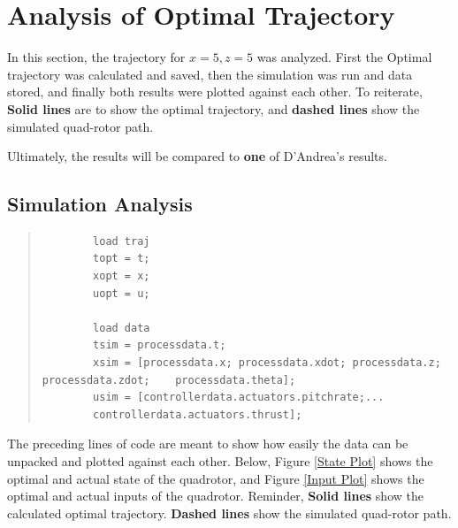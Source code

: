 \documentclass[12pt]{article}
\begin{document}
	\section{Analysis of Optimal Trajectory}
	
	In this section, the trajectory for $x=5,z=5$ was analyzed. First the Optimal trajectory was calculated and saved, then the simulation was run and data stored, and finally both results were plotted against each other. To reiterate, \textbf{Solid lines} are to show the optimal trajectory, and \textbf{dashed lines} show the simulated quad-rotor path.
	
	Ultimately, the results will be compared to \textbf{one} of D'Andrea's results\cite{D'Andrea}. 
	
	\subsection{Simulation Analysis}
	\begin{quote}
		\begin{lstlisting}
		load traj
		topt = t;
		xopt = x;
		uopt = u;
		
		load data
		tsim = processdata.t;
		xsim = [processdata.x; processdata.xdot; processdata.z; processdata.zdot;    processdata.theta];
		usim = [controllerdata.actuators.pitchrate;...
		controllerdata.actuators.thrust];
		\end{lstlisting}
	\end{quote}
	The preceding lines of code are meant to show how easily the data can be unpacked and plotted against each other. Below, Figure \ref{State Plot} shows the optimal and actual state of the quadrotor, and Figure \ref{Input Plot} shows the optimal and actual inputs of the quadrotor.
	\newline
	\newline
	Reminder, \textbf{Solid lines} show the calculated optimal trajectory. \textbf{Dashed lines} show the simulated quad-rotor path.
	
\end{document}
